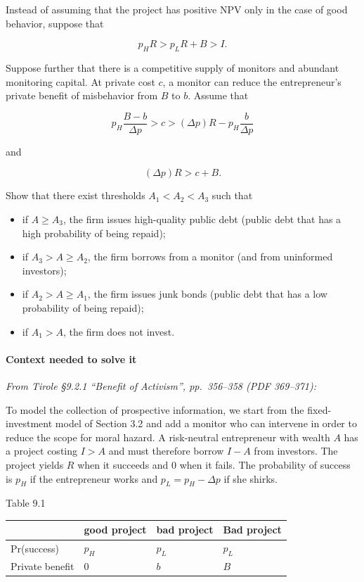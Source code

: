 \documentclass[11pt,a4paper]{article}
\providecommand{\tightlist}{\setlength{\itemsep}{0pt}\setlength{\parskip}{0pt}}
\begin{document}
Instead of assuming that the project has positive NPV only in the case of good behavior, suppose
that

\[p_H R > p_L R + B > I.\]

Suppose further that there is a competitive supply of monitors and abundant monitoring capital. At
private cost \(c\), a monitor can reduce the entrepreneur's private benefit of misbehavior from
\(B\) to \(b\). Assume that

\[p_H\frac{B - b}{\Delta p} > c > (\Delta p)R - p_H\frac{b}{\Delta p}\]

and

\[(\Delta p)R > c + B.\]

Show that there exist thresholds \(A_1 < A_2 < A_3\) such that

\begin{itemize}
\tightlist
\item
  if \(A \geqslant A_3\), the firm issues high-quality public debt (public debt that has a high
  probability of being repaid);
\item
  if \(A_3 > A \geqslant A_2\), the firm borrows from a monitor (and from uninformed investors);
\item
  if \(A_2 > A \geqslant A_1\), the firm issues junk bonds (public debt that has a low probability
  of being repaid);
\item
  if \(A_1 > A\), the firm does not invest.
\end{itemize}

\paragraph{Context needed to solve it}

\emph{From Tirole §9.2.1 ``Benefit of Activism'', pp.~356--358 (PDF 369--371):}

To model the collection of prospective information, we start from the fixed-investment model of
Section 3.2 and add a monitor who can intervene in order to reduce the scope for moral hazard. A
risk-neutral entrepreneur with wealth \(A\) has a project costing \(I > A\) and must therefore
borrow \(I - A\) from investors. The project yields \(R\) when it succeeds and 0 when it fails. The
probability of success is \(p_H\) if the entrepreneur works and \(p_L = p_H - \Delta p\) if she
shirks.

Table 9.1

{\def\LTcaptype{none} %
\begin{longtable}[]{@{}llll@{}}
\toprule\noalign{}
& good project & bad project & Bad project \\
\midrule\noalign{}
\endhead
\bottomrule\noalign{}
\endlastfoot
Pr(success) & \(p_H\) & \(p_L\) & \(p_L\) \\
Private benefit & 0 & \(b\) & \(B\) \\
\end{longtable}
}
\end{document}
